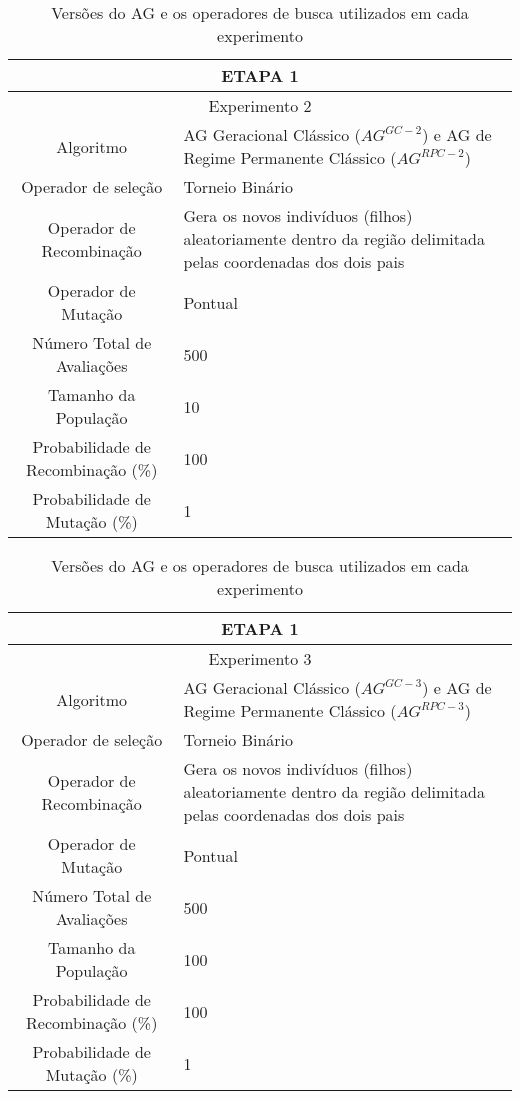 \begin{table}[H]
\centering
\caption{Versões do AG e os operadores de busca utilizados em cada experimento}

\begin{tabular}{|c|p{10cm}|}
 \hline
 \multicolumn{2}{|c|}{ETAPA 1} \\ \hline
 \multicolumn{2}{|c|}{Experimento 2} \\ \hline
{Algoritmo} & AG Geracional Clássico ($AG^{GC-2}$) e AG de Regime Permanente Clássico ($AG^{RPC-2}$) \\ \hline
 Operador de seleção & Torneio Binário \\ \hline
 Operador de Recombinação & Gera os novos indivíduos (filhos) aleatoriamente dentro da região delimitada pelas coordenadas dos dois pais \\  \hline
 Operador de Mutação & Pontual \\ \hline
 Número Total de Avaliações & 500 \\ \hline
 Tamanho da População & 10 \\ \hline
 Probabilidade de Recombinação (\%) & 100 \\ \hline
 Probabilidade de Mutação (\%) & 1 \\ \hline 
 
\end{tabular}
\end{table} 
 
 
 \begin{table}[H]
\centering
\caption{Versões do AG e os operadores de busca utilizados em cada experimento}

 \begin{tabular}{|c|p{10cm}|}
\hline
 \multicolumn{2}{|c|}{ETAPA 1} \\ \hline
 \multicolumn{2}{|c|}{Experimento 3} \\ \hline
{Algoritmo} & AG Geracional Clássico ($AG^{GC-3}$) e AG de Regime Permanente Clássico ($AG^{RPC-3}$) \\ \hline
 Operador de seleção & Torneio Binário \\ \hline
 Operador de Recombinação & Gera os novos indivíduos (filhos) aleatoriamente dentro da região delimitada pelas coordenadas dos dois pais \\  \hline
 Operador de Mutação & Pontual \\ \hline
 Número Total de Avaliações & 500 \\ \hline
 Tamanho da População & 100 \\ \hline
 Probabilidade de Recombinação (\%) & 100 \\ \hline
 Probabilidade de Mutação (\%) & 1 \\ \hline 
 
 
 
\end{tabular}
\end{table} 
 

